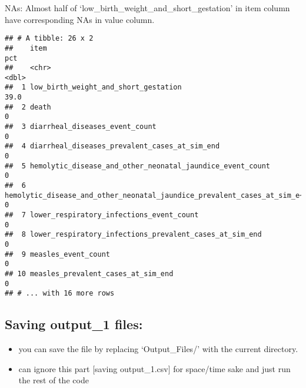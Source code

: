 \documentclass[]{article}
\newenvironment{Shaded}{\begin{snugshade}}{\end{snugshade}}
\newcommand{\DataTypeTok}[1]{\textcolor[rgb]{0.13,0.29,0.53}{#1}}
\newcommand{\DecValTok}[1]{\textcolor[rgb]{0.00,0.00,0.81}{#1}}
\newcommand{\KeywordTok}[1]{\textcolor[rgb]{0.13,0.29,0.53}{\textbf{#1}}}
\newcommand{\NormalTok}[1]{#1}
\newcommand{\OperatorTok}[1]{\textcolor[rgb]{0.81,0.36,0.00}{\textbf{#1}}}
\newcommand{\StringTok}[1]{\textcolor[rgb]{0.31,0.60,0.02}{#1}}
\providecommand{\tightlist}{%
  \setlength{\itemsep}{0pt}\setlength{\parskip}{0pt}}
\begin{document}
NAs: Almost half of `low\_birth\_weight\_and\_short\_gestation' in item
column have corresponding NAs in value column.

\begin{Shaded}
\end{Shaded}

\begin{verbatim}
## # A tibble: 26 x 2
##    item                                                                      pct
##    <chr>                                                                   <dbl>
##  1 low_birth_weight_and_short_gestation                                     39.0
##  2 death                                                                     0  
##  3 diarrheal_diseases_event_count                                            0  
##  4 diarrheal_diseases_prevalent_cases_at_sim_end                             0  
##  5 hemolytic_disease_and_other_neonatal_jaundice_event_count                 0  
##  6 hemolytic_disease_and_other_neonatal_jaundice_prevalent_cases_at_sim_e~   0  
##  7 lower_respiratory_infections_event_count                                  0  
##  8 lower_respiratory_infections_prevalent_cases_at_sim_end                   0  
##  9 measles_event_count                                                       0  
## 10 measles_prevalent_cases_at_sim_end                                        0  
## # ... with 16 more rows
\end{verbatim}

\hypertarget{saving-output_1-files}{%
\subsection{Saving output\_1 files:}\label{saving-output_1-files}}

\begin{itemize}
\tightlist
\item
  you can save the file by replacing `Output\_Files/' with the current
  directory.
\item
  can ignore this part {[}saving output\_1.csv{]} for space/time sake
  and just run the rest of the code
\end{itemize}
\end{document}
